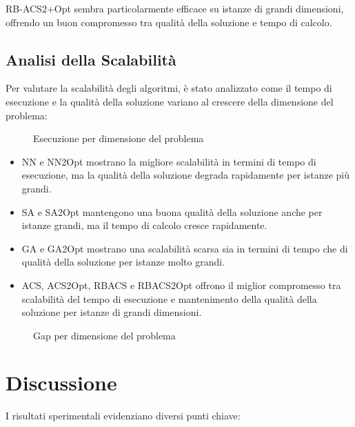 RB-ACS2+Opt sembra particolarmente efficace su istanze di grandi dimensioni, offrendo un buon compromesso tra qualità della soluzione e tempo di calcolo.

\subsection{Analisi della Scalabilità}
Per valutare la scalabilità degli algoritmi, è stato analizzato come il tempo di esecuzione e la qualità della soluzione variano al crescere della dimensione del problema:

\begin{figure}[h]	
	\caption{Esecuzione per dimensione del problema}
	\label{fig:time_vs_size}
\end{figure}

\begin{itemize}
	\item NN e NN2Opt mostrano la migliore scalabilità in termini di tempo di esecuzione, ma la qualità della soluzione degrada rapidamente per istanze più grandi.
	\item SA e SA2Opt mantengono una buona qualità della soluzione anche per istanze grandi, ma il tempo di calcolo cresce rapidamente.
	\item GA e GA2Opt mostrano una scalabilità scarsa sia in termini di tempo che di qualità della soluzione per istanze molto grandi.
	\item ACS, ACS2Opt, RBACS e RBACS2Opt offrono il miglior compromesso tra scalabilità del tempo di esecuzione e mantenimento della qualità della soluzione per istanze di grandi dimensioni.
\end{itemize}

\begin{figure}[h]
	\caption{Gap per dimensione del problema}
	\label{fig:time_vs_gap}
\end{figure}

\section{Discussione}
\label{sec:discussione}

I risultati sperimentali evidenziano diversi punti chiave:

